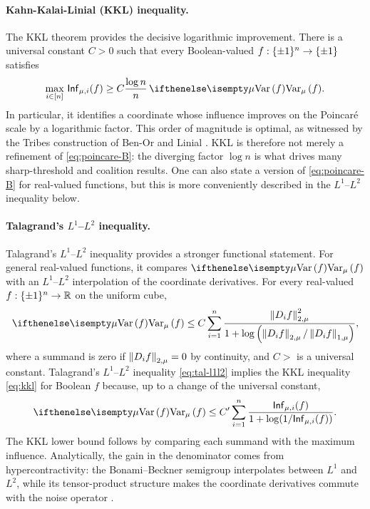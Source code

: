 \paragraph{Kahn-Kalai-Linial (KKL) inequality.}
The KKL theorem provides the decisive logarithmic improvement. 
There is a universal constant $C>0$ such that every Boolean-valued $f: \{\pm 1\}^n \to \{\pm 1\}$ satisfies
\begin{equation}\label{eq:kkl}
    \max_{i\in[n]} \,\Inf_{\mu,i}(f)
    \geq C \frac{\log n}{n} \,\Var[\mu]{f}.
\end{equation}
In particular, it identifies a coordinate whose influence improves on the Poincaré scale by a logarithmic factor.
This order of magnitude is optimal, as witnessed by the Tribes construction of Ben-Or and Linial \cite{BenOrLinial90}. KKL is therefore not merely a refinement of \cref{eq:poincare-B}: the diverging factor $\log n$ is what drives many sharp-threshold and coalition results.
One can also state a version of \cref{eq:poincare-B} for real-valued functions, but this is more conveniently described in the $L^1$--$L^2$ inequality below.

\paragraph{Talagrand's $L^1$--$L^2$ inequality.}
Talagrand's $L^1$--$L^2$ inequality provides a stronger functional statement. 
For general real-valued functions, it compares $\Var[\mu]{f}$ with an $L^1$--$L^2$ interpolation of the coordinate derivatives. 
For every real-valued $f: \{\pm 1\}^n \to \mathbb{R}$ on the uniform cube,
\begin{equation}\label{eq:tal-l1l2}
    \Var[\mu]{f}
    \leq C\sum_{i=1}^n
    \frac{\norm{D_i f}_{2,\mu}^2}
    {1+\log\left(\norm{D_i f}_{2,\mu}/\norm{D_i f}_{1,\mu}\right)},
\end{equation}
where a summand is zero if $\left\lVert D_i f \right\rVert_{2,\mu} = 0$ by continuity, and $C>$ is a universal constant. 
Talagrand's $L^1$--$L^2$ inequality \cref{eq:tal-l1l2} implies the KKL inequality \cref{eq:kkl} for Boolean $f$ because, up to a change of the universal constant,
\begin{equation}\label{eq:tal-influence}
    \Var[\mu]{f}
    \leq C'\sum_{i=1}^n
    \frac{\Inf_{\mu,i}(f)}{1+\log(1/\Inf_{\mu,i}(f))}.
\end{equation}
The KKL lower bound follows by comparing each summand with the maximum influence. Analytically, the gain in the denominator comes from hypercontractivity: the Bonami--Beckner semigroup interpolates between $L^1$ and $L^2$, while its tensor-product structure makes the coordinate derivatives commute with the noise operator \cite{Bonami70,Beckner75,Gross75}.

